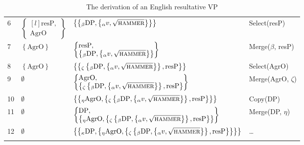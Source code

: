 \documentclass[MilwayThesis]{subfiles}
\begin{document}
\begin{longtabu}{llll}
6 & $
\begin{Bmatrix*}[l]
	\text{resP},\\
	\text{AgrO}
\end{Bmatrix*}
$ & $ \left\{\left\{_\beta\text{DP}, \left\{_\alpha v, \sqrt{\textsc{hammer}}\right\}\right\}\right\}$ &
Select(resP)\\
7 & $\left\{ \text{AgrO} \right\}$ & $
\begin{Bmatrix*}[l]
	\text{resP},\\
	\left\{_\beta\text{DP}, \left\{_\alpha v, \sqrt{\textsc{hammer}}\right\}\right\}
\end{Bmatrix*}
$ & Merge\footnotemark($\beta$, resP)\\
8 & $\left\{ \text{AgrO} \right\}$ & $
\left\{\left\{_\zeta\left\{_\beta\text{DP}, \left\{_\alpha v, \sqrt{\textsc{hammer}}\right\}\right\}, \text{resP}\right\}\right\}
$ & Select(AgrO)\\
9 & $\emptyset$ & $
\begin{Bmatrix*}[l]
	\text{AgrO},\\
	\left\{_\zeta\left\{_\beta\text{DP}, \left\{_\alpha v, \sqrt{\textsc{hammer}}\right\}\right\}, \text{resP}\right\}
\end{Bmatrix*}
$ & Merge(AgrO, $\zeta$)\\
10 & $\emptyset$ & $
\left\{\left\{_\eta \text{AgrO}, \left\{_\zeta \left\{_\beta\text{DP}, \left\{_\alpha v, \sqrt{\textsc{hammer}}\right\}\right\}, \text{resP}\right\}\right\}\right\}$ & Copy(DP) \\
11 & $\emptyset$ & $
\begin{Bmatrix*}[l]
	\text{DP},\\
	\left\{_\eta \text{AgrO}, \left\{_\zeta\left\{_\beta\text{DP}, \left\{_\alpha v, \sqrt{\textsc{hammer}}\right\}\right\}, \text{resP}\right\}\right\}
\end{Bmatrix*}
$ & Merge(DP, $\eta$) \\
12 & $\emptyset$ & $
\left\{\left\{_\kappa
	\text{DP},\left\{_\eta \text{AgrO}, \left\{_\zeta\left\{_\beta\text{DP}, \left\{_\alpha v, \sqrt{\textsc{hammer}}\right\}\right\},\text{resP}\right\}\right\}
\right\}\right\}$ & \dots\\
\caption{The derivation of an English resultative VP}
\label{tab:EngVP}
\end{longtabu}
\end{document}
